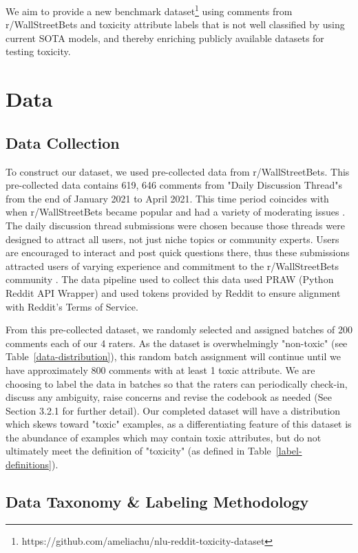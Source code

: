 \documentclass[11pt]{article}
\begin{document}
We aim to provide a new benchmark dataset\footnote{https://github.com/ameliachu/nlu-reddit-toxicity-dataset} using comments from r/WallStreetBets and toxicity attribute labels that is not well classified by using current SOTA models, and thereby enriching publicly available datasets for testing toxicity.


\section{Data}
\subsection{Data Collection}
To construct our dataset, we used pre-collected data from r/WallStreetBets. This pre-collected data contains 619, 646 comments from "Daily Discussion Thread"s from the end of January 2021 to April 2021. This time period coincides with when  r/WallStreetBets became popular and had a variety of moderating issues \citep{mcenery2021}. The daily discussion thread submissions were chosen because those threads were designed to attract all users, not just niche topics or community experts. Users are encouraged to interact and post quick questions there, thus these submissions attracted users of varying experience and commitment to the r/WallStreetBets community \citep{wsb2022}. The data pipeline used to collect this data used PRAW (Python Reddit API Wrapper) and used tokens provided by Reddit to ensure alignment with Reddit's Terms of Service. 


From this pre-collected dataset, we randomly selected and assigned batches of 200 comments each of our 4 raters. As the dataset is overwhelmingly "non-toxic" (see Table~\ref{data-distribution}), this random batch assignment will continue until we have approximately 800 comments with at least 1 toxic attribute. We are choosing to label the data in batches so that the raters can periodically check-in, discuss any ambiguity, raise concerns and revise the codebook as needed (See Section 3.2.1 for further detail). Our completed dataset will have a distribution which skews toward "toxic" examples, as a differentiating feature of this dataset is the abundance of examples which may contain toxic attributes, but do not ultimately meet the definition of "toxicity" (as defined in Table~\ref{label-definitions}).

\subsection{Data Taxonomy \& Labeling Methodology}
\end{document}
